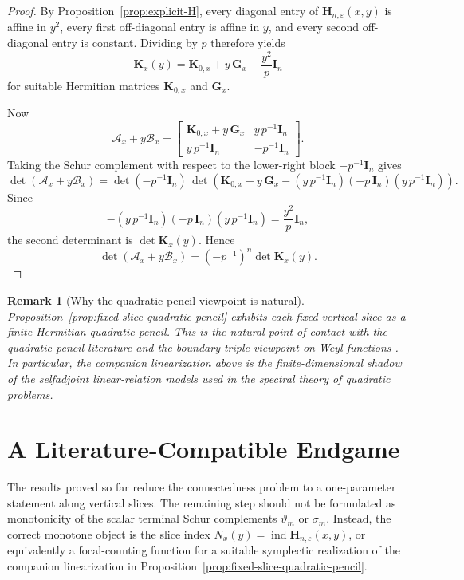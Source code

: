 \documentclass[11pt]{article}
\newtheorem{remark}[theorem]{Remark}
\DeclareMathOperator{\ind}{ind}
\begin{document}
\begin{proof}
By Proposition~\ref{prop:explicit-H}, every diagonal entry of \(\mathbf H_{n,\varepsilon}(x,y)\)
is affine in \(y^2\), every first off-diagonal entry is affine in \(y\), and every second
off-diagonal entry is constant. Dividing by \(p\) therefore yields
\[
\mathbf K_x(y)=\mathbf K_{0,x}+y\,\mathbf G_x+\frac{y^2}{p}\mathbf I_n
\]
for suitable Hermitian matrices \(\mathbf K_{0,x}\) and \(\mathbf G_x\).

Now
\[
\mathcal A_x+y\mathcal B_x
=
\begin{bmatrix}
\mathbf K_{0,x}+y\,\mathbf G_x & y\,p^{-1}\mathbf I_n\\
y\,p^{-1}\mathbf I_n & -p^{-1}\mathbf I_n
\end{bmatrix}.
\]
Taking the Schur complement with respect to the lower-right block \(-p^{-1}\mathbf I_n\) gives
\[
\det(\mathcal A_x+y\mathcal B_x)
=
\det(-p^{-1}\mathbf I_n)\,
\det\!\left(
\mathbf K_{0,x}+y\,\mathbf G_x
-(y\,p^{-1}\mathbf I_n)(-p\,\mathbf I_n)(y\,p^{-1}\mathbf I_n)
\right).
\]
Since
\[
-(y\,p^{-1}\mathbf I_n)(-p\,\mathbf I_n)(y\,p^{-1}\mathbf I_n)
=
\frac{y^2}{p}\mathbf I_n,
\]
the second determinant is \(\det \mathbf K_x(y)\). Hence
\[
\det(\mathcal A_x+y\mathcal B_x)=(-p^{-1})^n \det \mathbf K_x(y).
\]
\end{proof}

\begin{remark}[Why the quadratic-pencil viewpoint is natural]\label{rem:quadratic-pencil-literature}
Proposition~\ref{prop:fixed-slice-quadratic-pencil} exhibits each fixed vertical slice as a finite
Hermitian quadratic pencil. This is the natural point of contact with the quadratic-pencil
literature and the boundary-triple viewpoint on Weyl functions
\cite{BehrndtLanger2007,BehrndtDerkachHassiSnoo2011,EckhardtKostenko2017}.
In particular, the companion linearization above is the finite-dimensional shadow of the
selfadjoint linear-relation models used in the spectral theory of quadratic problems.
\end{remark}

\section{A Literature-Compatible Endgame}

The results proved so far reduce the connectedness problem to a one-parameter statement along
vertical slices. The remaining step should not be formulated as monotonicity of the scalar terminal
Schur complements \(\vartheta_m\) or \(\sigma_m\). Instead, the correct monotone object is the slice
index \(N_x(y)=\ind \mathbf H_{n,\varepsilon}(x,y)\), or equivalently a focal-counting function for a
suitable symplectic realization of the companion linearization in
Proposition~\ref{prop:fixed-slice-quadratic-pencil}.
\end{document}

